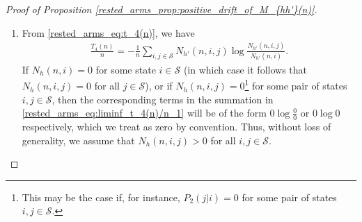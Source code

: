 \begin{proof}[Proof of Proposition \ref{rested_arms_prop:positive_drift_of_M_{hh'}(n)}]
\begin{enumerate}
    Using the same arguments as those used to simplify \eqref{rested_arms_eq:liminf_t_2(n)/n_1}, we obtain the following: there exists a positive integer $M_3=M_3(\epsilon')$ such that for all $n\geq M_3$, we have
    \begingroup\allowdisplaybreaks\begin{align}
    	\frac{T_{3}(n)}{n}
    	\geq \frac{\sum\limits_{a\neq h}N_a(n)}{n}\bigg\lbrace\bigg[\sum\limits_{i\in\mathcal{S}}\sum\limits_{j\in\mathcal{S}}(\mu_2(i)P_2(j|i)+\epsilon')
    	\log\frac{\mu_2(i)P_2(j|i)+\epsilon'}{\mu_2(i)+\epsilon'|\mathcal{S}|}\bigg]-\epsilon'\bigg\rbrace.\label{rested_arms_eq:liminf_t_3(n)/n_final}
    \end{align}\endgroup
    \item From \eqref{rested_arms_eq:t_4(n)}, we have
    \begingroup\allowdisplaybreaks\begin{align}
    	\frac{T_4(n)}{n}=-\frac{1}{n}\sum\limits_{i,j\in\mathcal{S}}N_{h'}(n,i,j)\log\frac{N_{h'}(n,i,j)}{N_{h'}(n,i)}\label{rested_arms_eq:liminf_t_4(n)/n_1}.
    \end{align}\endgroup
If $N_h(n,i)=0$ for some state $i\in\mathcal{S}$ (in which case it follows that $N_h(n,i,j)=0$ for all $j\in\mathcal{S}$), or if $N_h(n,i,j)=0$\footnote{This may be the case if, for instance, $P_2(j|i)=0$ for some pair of states $i,j\in\mathcal{S}$.} for some pair of states $i,j\in\mathcal{S}$, then the corresponding terms in the summation in \eqref{rested_arms_eq:liminf_t_4(n)/n_1} will be of the form $0\log \frac{0}{0}$ or $0\log 0$ respectively, which we treat as zero by convention. Thus, without loss of generality, we assume that $N_h(n,i,j)>0$ for all $i,j\in\mathcal{S}$.





\end{enumerate}
\end{proof}
